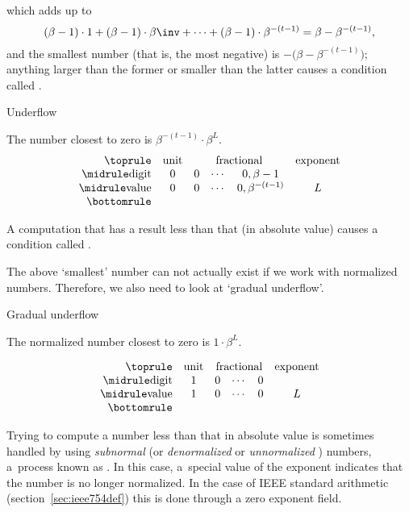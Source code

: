 which adds up to
\begin{equation}
  (\beta-1)\cdot1+(\beta-1)\cdot\beta\inv+\cdots
+(\beta-1)\cdot\beta^{-(t-1)}=\beta-\beta^{-(t-1)},
\end{equation}
and the smallest number
(that is, the most negative)
is
$-\bigl(\beta-\beta^{-(t-1)}\bigr)$;
anything larger than the
former or smaller than the latter causes a condition called
.

 {Underflow}

The number closest to zero is $\beta^{-(t-1)}\cdot \beta^L$.
\begin{equation}
\begin{array}{rccccc}
  \toprule
  &\textrm{unit}&\multicolumn{3}{c}{\textrm{fractional}}&\textrm{exponent}\\
  \midrule
  \textrm{digit}&0&0&\cdots&0,\beta-1&\\
  \midrule
  \textrm{value}&0&0&\cdots&0,\beta^{-(t-1)}&L\\
  \bottomrule
\end{array}
\end{equation}

A computation that has a result less than that
(in absolute value) causes a condition called . 

The above `smallest' number can not actually exist if we work with
normalized numbers.
Therefore, we also need to look at `gradual underflow'.

 {Gradual underflow}
\label{sec:underflow}

The normalized number closest to zero is $1\cdot \beta^L$.

\begin{equation}
\begin{array}{rccccc}
  \toprule
  &\textrm{unit}&\multicolumn{3}{c}{\textrm{fractional}}&\textrm{exponent}\\
  \midrule
  \textrm{digit}& 1& 0&\cdots&0&\\
  \midrule
  \textrm{value}& 1& 0&\cdots&0&L\\
  \bottomrule
\end{array}
\end{equation}

Trying
to compute a number less than that in absolute value is sometimes
handled by using
\emph{subnormal}
(or \emph{denormalized}%
or \emph{unnormalized}%
%
) numbers,
a~process known as .
In this case, a~special
value of the exponent indicates that the number is no longer normalized.
In the case of IEEE standard arithmetic (section~\ref{sec:ieee754def})
this is done through a zero exponent field.

